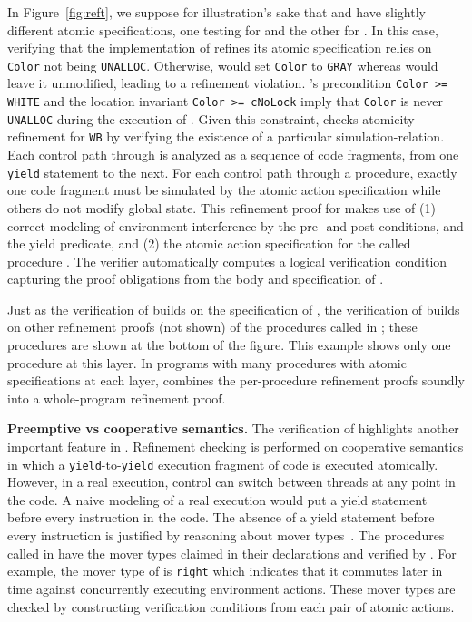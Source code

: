 In Figure~\ref{fig:reft}, we suppose for illustration's sake that  and  have slightly different atomic specifications,
one testing for  and the other for .
In this case, verifying that the implementation of  refines its atomic specification relies on {\tt Color} not being {\tt UNALLOC}.
Otherwise,  would set {\tt Color} to {\tt GRAY} whereas  would leave it unmodified, leading to a refinement violation. 
's precondition {\tt Color >=  WHITE} and the location invariant {\tt Color >= cNoLock} imply that {\tt Color} is never {\tt UNALLOC} during the execution of . 
Given this constraint, \civl checks atomicity refinement for {\tt WB} by verifying the existence of a particular simulation-relation. 
Each control path through  is analyzed as a sequence of code fragments, from one {\tt yield} statement to the next.
For each control path through a procedure, exactly one code fragment must be simulated by the atomic action specification while others do not modify global state.
This refinement proof for  makes use of (1) correct modeling of environment interference by the pre- and post-conditions, and the yield predicate, and (2) the atomic action specification for the called procedure . 
The \civl verifier automatically computes a logical verification condition capturing the proof obligations from the body and specification of .

Just as the verification of  builds on the specification of , the verification of  builds on other refinement proofs (not shown) of the procedures called in ; these procedures are shown at the bottom of the figure. 
This example shows only one procedure at this layer. In programs with many procedures with atomic specifications at each layer, \civl combines the per-procedure refinement proofs soundly into a whole-program refinement proof. 

{\bf Preemptive vs cooperative semantics.}
The verification of  highlights another important feature in \civl. 
Refinement checking is performed on cooperative semantics in which a 
{\tt yield}-to-{\tt yield} execution fragment of code is executed atomically.
However, in a real execution, control can switch between threads at any point in the code. 
A naive modeling of a real execution would put a yield statement before every instruction in the code.
The absence of a yield statement before every instruction is justified by reasoning about mover types~\cite{FlanaganFLQ08}. 
The procedures called in  have the mover types claimed in their
declarations and verified by \civl. 
For example, the mover type of  is {\tt right} which indicates 
that it commutes later in time against concurrently executing
environment actions. 
These mover types are checked by constructing verification conditions from each pair of atomic actions.

